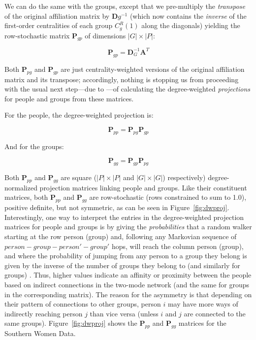 \documentclass[a4paper,fleqn]{cas-sc}
\begin{document}
We can do the same with the groups, except that we pre-multiply the \textit{transpose} of the original affiliation matrix by $\mathbf{D}g^{-1}$ (which now contains the \textit{inverse} of the first-order centralities of each group $C^R_g(1)$ along the diagonals) yielding the row-stochastic matrix $\mathbf{P}_{gp}$ of dimensions $|G| \times |P|$:

\begin{equation}
    \mathbf{P}_{gp} = \mathbf{D}_G^{-1}\mathbf{A}^T
    \label{eq:ca2}
\end{equation}

Both $\mathbf{P}_{pg}$ and $\mathbf{P}_{gp}$ are just centrality-weighted versions of the original affiliation matrix and its transpose; accordingly, nothing is stopping us from proceeding with the usual next step---due to \citet{breiger1974duality}---of calculating the degree-weighted \textit{projections} for people and groups from these matrices. 

For the people, the degree-weighted projection is:

\begin{equation}
\mathbf{P}_{pp} = \mathbf{P}_{pg}\mathbf{P}_{gp}
    \label{eq:ca3}
\end{equation}

And for the groups:

\begin{equation}
    \mathbf{P}_{gg} = \mathbf{P}_{gp}\mathbf{P}_{pg}
    \label{eq:ca4}
\end{equation}

Both $\mathbf{P}_{pp}$ and $\mathbf{P}_{gg}$ are square ($|P| \times |P|$ and $|G| \times |G|$) respectively) degree-normalized projection matrices linking people and groups. Like their constituent matrices, both $\mathbf{P}_{pp}$ and $\mathbf{P}_{gg}$ are row-stochastic (rows constrained to sum to 1.0), positive definite, but not symmetric, as can be seen in Figure~\ref{fig:dwproj}. Interestingly, one way to interpret the entries in the degree-weighted projection matrices for people and groups is by giving the \textit{probabilities} that a random walker starting at the row person (group) and, following any Markovian sequence of $person-group-person'-group'$ hops, will reach the column person (group), and where the probability of jumping from any person to a group they belong is given by the inverse of the number of groups they belong to (and similarly for groups) \citep[240]{deng2009generalized}. Thus, higher values indicate an affinity or proximity between the people based on indirect connections in the two-mode network (and the same for groups in the corresponding matrix). The reason for the asymmetry is that depending on their pattern of connections to other groups, person $i$ may have more ways of indirectly reaching person $j$ than vice versa (unless $i$ and $j$ are connected to the same groups). Figure~\ref{fig:dwproj} shows the $\mathbf{P}_{pp}$ and $\mathbf{P}_{gg}$ matrices for the Southern Women Data. 
\end{document}

